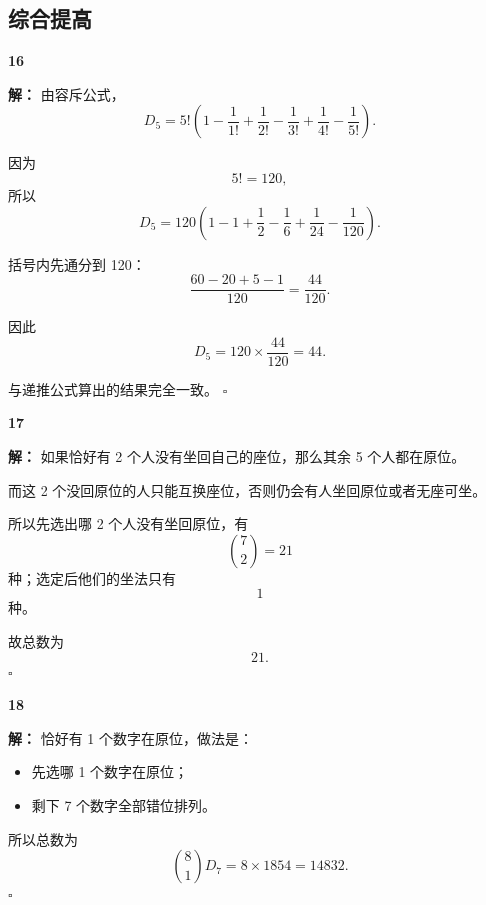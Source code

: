 \documentclass[11pt,a4paper,fontset=fandol]{ctexart}
\theoremstyle{formalexample}
\newenvironment{solution}{\par\noindent\textbf{解：}}{\hfill$\square$\par}
\begin{document}
\subsection*{综合提高}

\textbf{16}\begin{solution}
由容斥公式，
\[
D_5=5!\left(1-\frac1{1!}+\frac1{2!}-\frac1{3!}+\frac1{4!}-\frac1{5!}\right).
\]

因为
\[
5!=120,
\]
所以
\[
D_5=120\left(1-1+\frac12-\frac16+\frac1{24}-\frac1{120}\right).
\]

括号内先通分到 120：
\[
\frac{60-20+5-1}{120}=\frac{44}{120}.
\]

因此
\[
D_5=120\times \frac{44}{120}=44.
\]

与递推公式算出的结果完全一致。
\end{solution}

\textbf{17}\begin{solution}
如果恰好有 2 个人没有坐回自己的座位，那么其余 5 个人都在原位。

而这 2 个没回原位的人只能互换座位，否则仍会有人坐回原位或者无座可坐。

所以先选出哪 2 个人没有坐回原位，有
\[
\binom{7}{2}=21
\]
种；选定后他们的坐法只有
\[
1
\]
种。

故总数为
\[
21.
\]
\end{solution}

\textbf{18}\begin{solution}
恰好有 1 个数字在原位，做法是：
\begin{itemize}
  \item 先选哪 1 个数字在原位；
  \item 剩下 7 个数字全部错位排列。
\end{itemize}

所以总数为
\[
\binom81 D_7=8\times 1854=14832.
\]
\end{solution}
\end{document}
